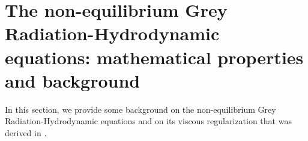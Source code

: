 \documentclass[times,doublespace]{fldauth}%
\begin{document}
%
\section{The non-equilibrium Grey Radiation-Hydrodynamic equations: mathematical properties and background}
\label{sec:GRH}
%
In this section, we provide some background on the non-equilibrium Grey Radiation-Hydrodynamic equations and on its viscous regularization that was derived in \cite{our_jcp_radhy_paper}.
%
%

\end{document}
